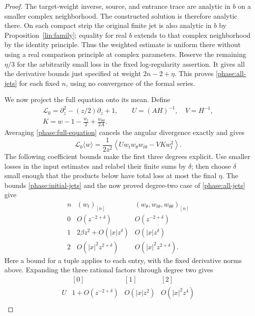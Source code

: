 \begin{proof}
The target-weight inverse, source, and entrance trace are analytic in
$b$ on a smaller complex neighborhood.  The constructed solution is
therefore analytic there.  On each compact strip the original finite
jet is also analytic in $b$ by Proposition~\ref{lin:family}; equality
for real $b$ extends to that complex neighborhood by the identity
principle.  Thus the weighted estimate is uniform there without using
a real comparison principle at complex parameters.  Reserve the remaining
$\eta/3$ for the arbitrarily small loss in the fixed log-regularity
assertion.  It gives all the derivative bounds just specified at weight
$2n-2+\eta$.  This proves
\eqref{phase:all-jets} for each fixed $n$, using no convergence of the
formal series.

We now project the full equation onto its mean.  Define
\[
 \begin{gathered}
 \mathcal L_0=\partial_z^2-(z/2)\partial_z+1,\qquad
 U=(AH)^{-1},\quad V=H^{-1},\\
 K=w-1-\frac{w_t}{2}+\frac{w_{\theta\theta}}{2A}.
 \end{gathered}
\]
Averaging \eqref{phase:full-equation} cancels the angular divergence
exactly and gives
\begin{equation}
 \mathcal L_0\langle w\rangle
 =\frac1{2z^2}\left\langle
          U w_t w_\theta w_{t\theta}-V K w_t^2\right\rangle.
 \label{phase:mean-equation}
\end{equation}
The following coefficient bounds make the first three degrees explicit.
Use smaller losses in the input estimates and relabel their finite sums
by $\delta$; then choose $\delta$ small enough that the products below
have total loss at most the final $\eta$.  The bounds
\eqref{phase:initial-jets} and the now proved degree-two case of
\eqref{phase:all-jets} give
\[
 \begin{array}{c|cc}
 n&(w_t)_{[n]}&(w_\theta,w_{t\theta},w_{\theta\theta})_{[n]}\\ \hline
 0&O(z^{-2+\delta})&O(z^{-2+\delta})\\
 1&2\beta z^2+O(|x|z^\delta)&O(|x|z^\delta)\\
 2&O(|x|^2z^{2+\delta})&O(|x|^2z^{2+\delta}).
 \end{array}
\]
Here a bound for a tuple applies to each entry, with the fixed derivative
norms above.  Expanding the three rational factors through degree two
gives
\[
 \begin{array}{c|ccc}
       &[0]&[1]&[2]\\ \hline
 U&1+O(z^{-2+\delta})&O(|x|z^2)&O(|x|^2z^4)\\

\end{array}\]
\end{proof}
